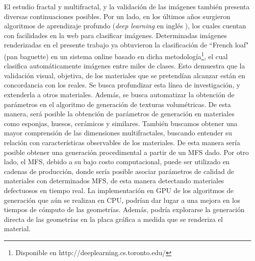 El estudio fractal y multifractal, y la validación de las imágenes también presenta diversas continuaciones posibles.
Por un lado, en los últimos años surgieron algoritmos de aprendizaje profundo ({\em deep learning} en inglés \cite{Kiros2014}), los cuales cuentan con facilidades en la web para clasificar imágenes.
Determinadas imágenes renderizadas en el presente trabajo ya obtuvieron la clasificación de ``French loaf" (pan baguette) en un sistema online basado en dicha metodología\footnote{Disponible en http://deeplearning.cs.toronto.edu/}, el cual clasifica automáticamente imágenes entre miles de clases.
Esto demuestra que la validación visual, objetiva, de los materiales que se pretendían alcanzar están en concordancia con los reales.
Se busca profundizar esta línea de investigación, y extenderla a otros materiales.
Además, se busca automatizar la obtención de parámetros en el algoritmo de generación de texturas volumétricas.
De esta manera, será posible la obtención de parámetros de generación en materiales como esponjas, huesos, cerámicos y similares.
También buscamos obtener una mayor comprensión de las dimensiones multifractales, buscando entender su relación con características observables de los materiales.
De esta manera sería posible obtener una generación procedimental a partir de un MFS dado.
Por otro lado, el MFS, debido a su bajo costo computacional, puede ser utilizado en cadenas de producción, donde sería posible asociar parámetros de calidad de materiales con determinados MFS, de esta manera detectando materiales defectuosos en tiempo real.
La implementación en GPU de los algoritmos de generación que aún se realizan en CPU, podrían dar lugar a una mejora en los tiempos de cómputo de las geometrías.
Además, podría explorarse la generación directa de las geometrías en la placa gráfica a medida que se renderiza el material.

